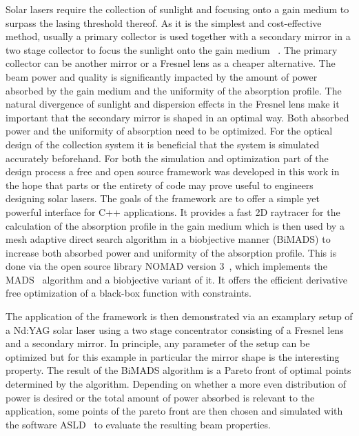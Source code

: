\documentclass[a4paper,10pt]{article}
\begin{document}
    Solar lasers require the collection of sunlight and focusing
    onto a gain medium to surpass the lasing threshold thereof.
    As it is the simplest and cost-effective method, usually
    a primary collector is used together with a secondary mirror in a 
    two stage collector to focus the sunlight onto the gain medium
    ~\cite{solar_lasers_magnesium}.
    The primary collector can be another mirror or a Fresnel lens
    as a cheaper alternative.
    The beam power and quality is significantly impacted by the
    amount of power absorbed by the gain medium and the uniformity
    of the absorption profile.
    The natural divergence of sunlight and dispersion effects in the
    Fresnel lens make it important that the secondary mirror is shaped
    in an optimal way.
    Both absorbed power and the uniformity of absorption need to be
    optimized.
    For the optical design of the collection system it is beneficial
    that the system is simulated accurately beforehand.
    For both the simulation and optimization part of the design process
    a free and open source framework was developed in this work in the
    hope that parts or the entirety of code may prove useful to engineers
    designing solar lasers.
    The goals of the framework are to offer a simple yet powerful interface
    for C++ applications.
    It provides a fast 2D raytracer for the calculation of the
    absorption profile in the gain medium which is then used by a
    mesh adaptive direct search algorithm in a biobjective manner (BiMADS) 
    to increase both absorbed power and uniformity of the absorption profile.
    This is done via the open source library NOMAD version 3~\cite{nomad3},
    which implements the MADS~\cite{mads_original} algorithm and a biobjective
    variant of it. 
    It offers the efficient derivative free optimization of a black-box
    function with constraints.

    The application of the framework is then demonstrated via an examplary
    setup of a Nd:YAG solar laser using a two stage concentrator consisting
    of a Fresnel lens and a secondary mirror.
    In principle, any parameter of the setup can be optimized but for this
    example in particular the mirror shape is the interesting property. 
    The result of the BiMADS algorithm is a Pareto front of optimal points 
    determined by the algorithm.
    Depending on whether a more even distribution of power is desired or
    the total amount of power absorbed is relevant to the application,
    some points of the pareto front are then chosen and simulated with
    the software ASLD~\cite{asld_website} to evaluate the resulting beam properties.
\end{document}
